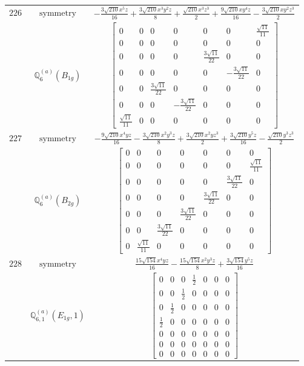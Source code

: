 \documentclass[fleqn,8pt,landscape]{jsarticle}
\begin{document}
\begin{longtable}{ccc}
$ 226 $ & $ \text{symmetry} $ & $ - \frac{3 \sqrt{210} x^{5} z}{16} + \frac{3 \sqrt{210} x^{3} y^{2} z}{8} + \frac{\sqrt{210} x^{3} z^{3}}{2} + \frac{9 \sqrt{210} x y^{4} z}{16} - \frac{3 \sqrt{210} x y^{2} z^{3}}{2} $ \\
$  $ & $ \mathbb{Q}_{6}^{(a)}(B_{1g}) $ & $ \begin{bmatrix} 0 & 0 & 0 & 0 & 0 & 0 & \frac{\sqrt{11}}{11} \\ 0 & 0 & 0 & 0 & 0 & 0 & 0 \\ 0 & 0 & 0 & 0 & \frac{3 \sqrt{11}}{22} & 0 & 0 \\ 0 & 0 & 0 & 0 & 0 & - \frac{3 \sqrt{11}}{22} & 0 \\ 0 & 0 & \frac{3 \sqrt{11}}{22} & 0 & 0 & 0 & 0 \\ 0 & 0 & 0 & - \frac{3 \sqrt{11}}{22} & 0 & 0 & 0 \\ \frac{\sqrt{11}}{11} & 0 & 0 & 0 & 0 & 0 & 0 \end{bmatrix} $ \\ \hline
$ 227 $ & $ \text{symmetry} $ & $ - \frac{9 \sqrt{210} x^{4} y z}{16} - \frac{3 \sqrt{210} x^{2} y^{3} z}{8} + \frac{3 \sqrt{210} x^{2} y z^{3}}{2} + \frac{3 \sqrt{210} y^{5} z}{16} - \frac{\sqrt{210} y^{3} z^{3}}{2} $ \\
$  $ & $ \mathbb{Q}_{6}^{(a)}(B_{2g}) $ & $ \begin{bmatrix} 0 & 0 & 0 & 0 & 0 & 0 & 0 \\ 0 & 0 & 0 & 0 & 0 & 0 & \frac{\sqrt{11}}{11} \\ 0 & 0 & 0 & 0 & 0 & \frac{3 \sqrt{11}}{22} & 0 \\ 0 & 0 & 0 & 0 & \frac{3 \sqrt{11}}{22} & 0 & 0 \\ 0 & 0 & 0 & \frac{3 \sqrt{11}}{22} & 0 & 0 & 0 \\ 0 & 0 & \frac{3 \sqrt{11}}{22} & 0 & 0 & 0 & 0 \\ 0 & \frac{\sqrt{11}}{11} & 0 & 0 & 0 & 0 & 0 \end{bmatrix} $ \\ \hline
$ 228 $ & $ \text{symmetry} $ & $ \frac{15 \sqrt{154} x^{4} y z}{16} - \frac{15 \sqrt{154} x^{2} y^{3} z}{8} + \frac{3 \sqrt{154} y^{5} z}{16} $ \\
$  $ & $ \mathbb{Q}_{6,1}^{(a)}(E_{1g},1) $ & $ \begin{bmatrix} 0 & 0 & 0 & \frac{1}{2} & 0 & 0 & 0 \\ 0 & 0 & \frac{1}{2} & 0 & 0 & 0 & 0 \\ 0 & \frac{1}{2} & 0 & 0 & 0 & 0 & 0 \\ \frac{1}{2} & 0 & 0 & 0 & 0 & 0 & 0 \\ 0 & 0 & 0 & 0 & 0 & 0 & 0 \\ 0 & 0 & 0 & 0 & 0 & 0 & 0 \\ 0 & 0 & 0 & 0 & 0 & 0 & 0 \end{bmatrix} $ \\ \hline

\end{longtable}
\end{document}
